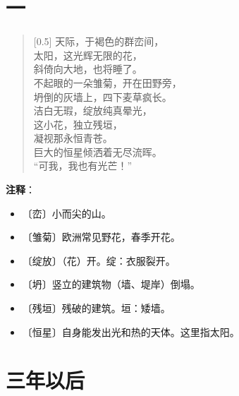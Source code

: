 \documentclass[12pt,UTF-8,openany]{ctexbook}
\begin{document}
\chapter{一}

\begin{normalsize}
    
    \begin{verse}[0.5\linewidth]
        天际，于褐色的群峦间， \\
        太阳，这光辉无限的花， \\
        斜倚向大地，也将睡了。 \\
        不起眼的一朵雏菊，开在田野旁， \\
        坍倒的灰墙上，四下麦草疯长。 \\
        洁白无瑕，绽放纯真晕光， \\
        这小花，独立残垣， \\
        凝视那永恒青苍。 \\
        巨大的恒星倾洒着无尽流晖。 \\
        “可我，我也有光芒！”
    \end{verse}
    
\end{normalsize}


\newpage

\textbf{注释}：

\vspace{-1em}

\begin{itemize}
    \setlength\itemsep{-0.2em}
    \item 〔峦〕小而尖的山。
    \item 〔雏菊〕欧洲常见野花，春季开花。
    \item 〔绽放〕（花）开。绽：衣服裂开。
    \item 〔坍〕竖立的建筑物（墙、堤岸）倒塌。
    \item 〔残垣〕残破的建筑。垣：矮墙。
    \item 〔恒星〕自身能发出光和热的天体。这里指太阳。
\end{itemize}

\chapter{三年以后}
\end{document}
